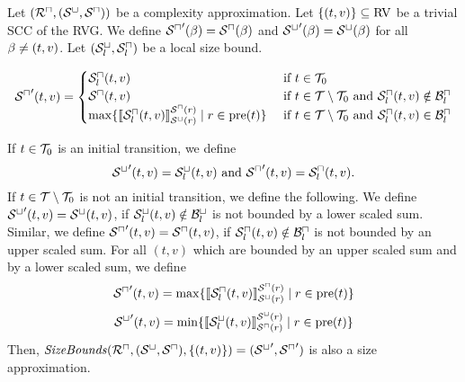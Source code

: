 \begin{theorem}
  Let $({\mathcal{R}^\sqcap}, {({\mathcal{S}^\sqcup}, {\mathcal{S}^\sqcap})})$ be a complexity approximation.
  Let $\lbrace (t,v) \rbrace \subseteq \text{RV}$ be a trivial SCC of the RVG.
  We define ${\mathcal{S}^\sqcap}'(\beta) = {\mathcal{S}^\sqcap}(\beta)$ and ${\mathcal{S}^\sqcup}'(\beta) = {\mathcal{S}^\sqcup}(\beta)$ for all $\beta \neq (t,v)$.
  Let ${({\mathcal{S}^\sqcup_l}, {\mathcal{S}^\sqcap_l})}$ be a local size bound.

  \[ {\mathcal{S}^\sqcap}'(t,v) =
  \begin{cases}
    {\mathcal{S}^\sqcap_l}(t, v) & \text{ if } t \in \mathcal{T}_0 \\
    {\mathcal{S}^\sqcap}(t, v) & \text{ if } t \in \mathcal{T} \setminus \mathcal{T}_0 \text{ and } {\mathcal{S}^\sqcap_l}(t,v) \notin \mathcal{B}^\sqcap_l \\
    \max \lbrace  \llbracket {\mathcal{S}^\sqcap_l}(t,v) \rrbracket_{{\mathcal{S}^\sqcup}(r)}^{{\mathcal{S}^\sqcap}(r)} \mid r \in \text{pre}(t) \rbrace & \text{ if } t \in \mathcal{T} \setminus \mathcal{T}_0 \text{ and } {\mathcal{S}^\sqcap_l}(t,v) \in \mathcal{B}^\sqcap_l \\
  \end{cases}
  \]

  If $t \in \mathcal{T}_0$ is an initial transition, we define
  \[ {\mathcal{S}^\sqcup}'(t, v) = {\mathcal{S}^\sqcup_l}(t, v) \text{ and } {\mathcal{S}^\sqcap}'(t, v) = {\mathcal{S}^\sqcap_l}(t, v). \]
  If $t \in \mathcal{T} \setminus \mathcal{T}_0$ is not an initial transition, we define the following.
  We define ${\mathcal{S}^\sqcup}'(t,v) = {\mathcal{S}^\sqcup}(t,v)$, if ${\mathcal{S}^\sqcup_l}(t,v) \notin \mathcal{B}^\sqcup_l$ is not bounded by a lower scaled sum.
  Similar, we define ${\mathcal{S}^\sqcap}'(t,v) = {\mathcal{S}^\sqcap}(t,v)$, if ${\mathcal{S}^\sqcap_l}(t,v) \notin \mathcal{B}^\sqcap_l$ is not bounded by an upper scaled sum.
  For all $(t,v)$ which are bounded by an upper scaled sum and by a lower scaled sum, we define 
  \[ {\mathcal{S}^\sqcap}'(t,v) = \max \lbrace  \llbracket {\mathcal{S}^\sqcap_l}(t,v) \rrbracket_{{\mathcal{S}^\sqcup}(r)}^{{\mathcal{S}^\sqcap}(r)} \mid r \in \text{pre}(t) \rbrace \]
  \[ {\mathcal{S}^\sqcup}'(t,v) = \min \lbrace  \llbracket {\mathcal{S}^\sqcup_l}(t,v) \rrbracket_{{\mathcal{S}^\sqcap}(r)}^{{\mathcal{S}^\sqcup}(r)} \mid r \in \text{pre}(t) \rbrace \]
  Then, $\mathit{SizeBounds}({\mathcal{R}^\sqcap}, {({\mathcal{S}^\sqcup}, {\mathcal{S}^\sqcap})}, \lbrace (t,v) \rbrace) = ({\mathcal{S}^\sqcup}', {\mathcal{S}^\sqcap}')$ is also a size approximation.
\end{theorem}

